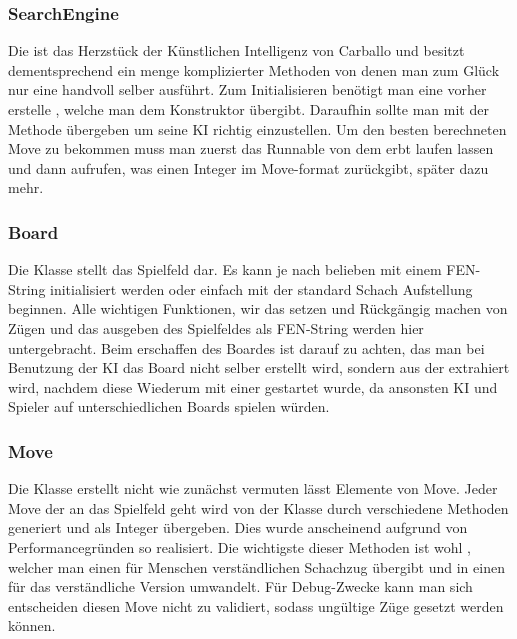 \subsubsection{SearchEngine}

Die  ist das Herzstück der Künstlichen Intelligenz von 
Carballo und besitzt dementsprechend ein menge komplizierter Methoden von denen 
man zum Glück nur eine handvoll selber ausführt. Zum Initialisieren benötigt man 
eine vorher erstelle , welche man dem Konstruktor übergibt. 
Daraufhin sollte man  mit der 
Methode  übergeben um seine KI richtig 
einzustellen. Um den besten berechneten Move zu bekommen muss man zuerst das 
Runnable von dem  erbt laufen lassen und dann 
 aufrufen, was einen Integer im Move-format zurückgibt, 
später dazu mehr.

\subsubsection{Board}

Die Klasse  stellt das Spielfeld dar. Es kann je nach belieben mit 
einem FEN-String initialisiert werden oder einfach mit der standard Schach 
Aufstellung beginnen. Alle wichtigen Funktionen, wir das setzen und Rückgängig 
machen von Zügen und das ausgeben des Spielfeldes als FEN-String werden hier 
untergebracht. Beim erschaffen des Boardes ist darauf zu achten, das man bei 
Benutzung der KI das Board nicht selber erstellt wird, sondern aus der 
 extrahiert wird, nachdem diese Wiederum mit einer 
gestartet wurde, da ansonsten KI und Spieler auf unterschiedlichen Boards 
spielen würden.

\subsubsection{Move}

Die Klasse  erstellt nicht wie zunächst vermuten lässt Elemente von 
Move. Jeder Move der an das Spielfeld geht wird von der Klasse  durch 
verschiedene Methoden generiert und als Integer übergeben. Dies wurde 
anscheinend aufgrund von Performancegründen so realisiert. Die wichtigste dieser 
Methoden ist wohl , welcher man einen für Menschen 
verständlichen Schachzug übergibt und in einen für das  
verständliche Version umwandelt. Für Debug-Zwecke kann man sich entscheiden 
diesen Move nicht zu validiert, sodass ungültige Züge gesetzt werden können.